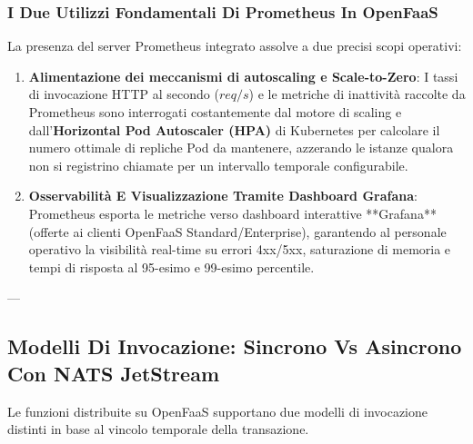 \documentclass[11pt, a4paper]{article}
\begin{document}
\subsubsection{I Due Utilizzi Fondamentali Di Prometheus In OpenFaaS}
La presenza del server Prometheus integrato assolve a due precisi scopi operativi:
\begin{enumerate}[noitemsep]
    \item \textbf{Alimentazione dei meccanismi di autoscaling e Scale-to-Zero}: I tassi di invocazione HTTP al secondo ($req/s$) e le metriche di inattività raccolte da Prometheus sono interrogati costantemente dal motore di scaling e dall'\textbf{Horizontal Pod Autoscaler (HPA)} di Kubernetes per calcolare il numero ottimale di repliche Pod da mantenere, azzerando le istanze qualora non si registrino chiamate per un intervallo temporale configurabile.
    \item \textbf{Osservabilità E Visualizzazione Tramite Dashboard Grafana}: Prometheus esporta le metriche verso dashboard interattive **Grafana** (offerte ai clienti OpenFaaS Standard/Enterprise), garantendo al personale operativo la visibilità real-time su errori 4xx/5xx, saturazione di memoria e tempi di risposta al 95-esimo e 99-esimo percentile.
\end{enumerate}

---

\subsection{Modelli Di Invocazione: Sincrono Vs Asincrono Con NATS JetStream}

Le funzioni distribuite su OpenFaaS supportano due modelli di invocazione distinti in base al vincolo temporale della transazione.
\end{document}
